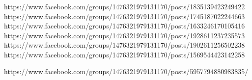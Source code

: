  
 
 
 
 


https://www.facebook.com/groups/1476321979131170/posts/1835139423249422
https://www.facebook.com/groups/1476321979131170/posts/1745187022244663
https://www.facebook.com/groups/1476321979131170/posts/1633246170105416
https://www.facebook.com/groups/1476321979131170/posts/1928611237235573
https://www.facebook.com/groups/1476321979131170/posts/1902611256502238
https://www.facebook.com/groups/1476321979131170/posts/1569544423142258

https://www.facebook.com/groups/1476321979131170/posts/5957794880983835/
